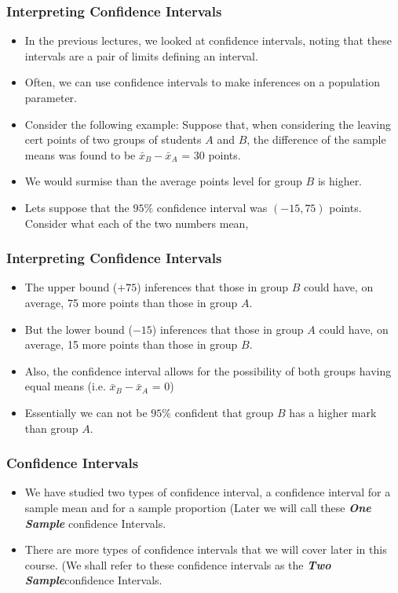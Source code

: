 \documentclass[a4]{beamer}
\begin{document}
\begin{frame}
\frametitle{Interpreting Confidence Intervals}
\begin{itemize}
\item In the previous lectures, we looked at confidence intervals, noting that these intervals are a pair of limits defining an interval.
\item Often, we can use confidence intervals to make inferences on a population parameter.
\item Consider the following example: Suppose that, when considering the leaving cert points of two groups of students $A$ and $B$, the difference of the sample means was found to be $\bar{x}_B-\bar{x}_A$ = 30 points.
\item We would surmise than the average points level for group $B$ is higher.
\item Lets suppose that the $95\%$ confidence interval was $(-15,75)$ points. Consider what each of the two numbers mean,
\end{itemize}
\end{frame}

\begin{frame}
\frametitle{Interpreting Confidence Intervals}
\begin{itemize}
\item The upper bound ($+75$) inferences that those in group $B$ could have, on average, 75 more points than those in group $A$.
\item But the lower bound ($-15$) inferences that those in group $A$ could have, on average, 15 more points than those in group $B$.
\item Also, the confidence interval allows for the possibility of both groups having equal means  (i.e. $\bar{x}_B-\bar{x}_A$ = 0)
\item Essentially we can not be $95\%$ confident that group $B$ has a higher mark than group $A$.
\end{itemize}
\end{frame}

\begin{frame}
\frametitle{Confidence Intervals}
\begin{itemize}
\item We have studied two types of confidence interval, a confidence interval for a sample mean and for a sample proportion (Later we will call these \textbf{\textit{One Sample}} confidence Intervals.
\item There are more types of confidence intervals that we will cover later in this course. (We shall refer to these confidence intervals as the \textbf{\textit{Two Sample}}confidence Intervals.
\end{itemize}
\end{frame}
\end{document}
